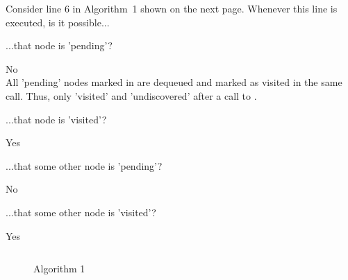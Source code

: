 \begin{prob}

        Consider line 6 in Algorithm~1 shown on the next page.
        Whenever this line is executed, is it possible...

    \begin{subprobset}

             \begin{subprob}
                ...that node is 'pending'?
            \end{subprob}

            \begin{soln}
                No\\
                All 'pending' nodes marked in  are dequeued and marked as visited in the same call. Thus, only 'visited' and 'undiscovered' after a call to .
            \end{soln}
            
            \vspace{1em}

            \begin{subprob}
                ...that node is 'visited'? %
            \end{subprob}

            \begin{soln}
                Yes
            \end{soln}

            \vspace{1em}

            \begin{subprob}
                ...that some other node is 'pending'?
            \end{subprob}

            \begin{soln}
                No
            \end{soln}

            \vspace{1em}

            \begin{subprob}
                ...that some other node is 'visited'?
            \end{subprob}

            \begin{soln}
                Yes
            \end{soln}

            \vspace{1em}

    \end{subprobset}

    \begin{figure}[h!]
        \caption{Algorithm 1}
        \inputminted{python}{\thisdir/include/algorithm.py}
    \end{figure}

\end{prob}